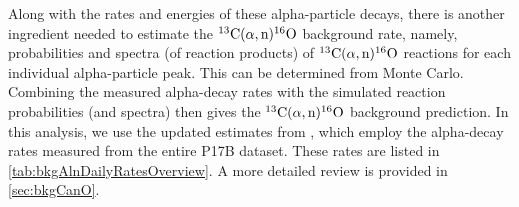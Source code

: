 \documentclass[../thesis.tex]{subfiles}
\begin{document}
Along with the rates and energies of these alpha-particle decays, there is another ingredient needed to estimate the $\CanO$ background rate, namely, probabilities and spectra (of reaction products) of $\CanO$ reactions for each individual alpha-particle peak. This can be determined from Monte Carlo. Combining the measured alpha-decay rates with the simulated reaction probabilities (and spectra) then gives the $\CanO$ background prediction. In this analysis, we use the updated estimates from \cite{lianghongBkg}, which employ the alpha-decay rates measured from the entire P17B dataset. These rates are listed in \autoref{tab:bkgAlnDailyRatesOverview}. A more detailed review is provided in \autoref{sec:bkgCanO}.

\begin{table}[ht]
  \caption{$\CanO$ background rates for the P17B data set \cite{lianghongBkg}.}
  \label{tab:bkgAlnDailyRatesOverview}
\end{table}
\end{document}
